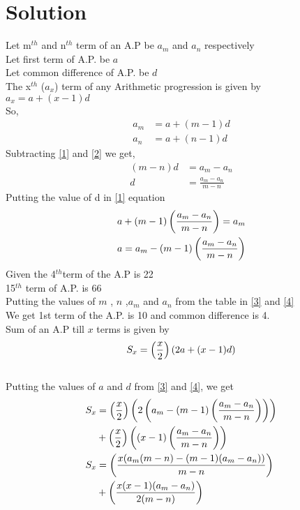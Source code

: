 \documentclass[journal,12pt,twocolumn]{IEEEtran}
\begin{document}
\section{Solution}
\begin{table}[h!]
   \label{table}
    \centering
   
\end{table}
Let m$^{th}$  and n$^{th}$ term of an A.P be $a_m$ and $a_n$ respectively\\
Let first term of A.P. be $a$\\
Let common difference of A.P. be $d$\\
The x$^{th}$ ($a_x$) term  of any Arithmetic progression is given by 
\\$a_x = a +(x-1)d$\\
So,
\begin{align}
a_m &= a+(m-1)d \label{1}\\
a_{n} &= a+(n-1)d \label{2}
\end{align}
Subtracting \eqref{1} and \eqref{2} we get,\\
\begin{align}
(m-n)d &= a_m - a_n\\
d &= \frac{a_m - a_n}{m-n}\label{3}
\end{align}
Putting the value of d in \eqref{1} equation 
\begin{align}
a + (m-1)\left(\frac{a_m - a_n}{m-n}\right) = a_m\\
a = a_m - (m-1)\left(\frac{a_m - a_n}{m-n}\right)\label{4}
\end{align}
Given the 4$^{th}$term of the A.P is 22\\
15$^{th}$ term of A.P. is 66\\
Putting the values of 
$m$ , $n$ ,$a_m$ and $a_n$ from the table 
in \eqref{3} and \eqref{4}\\
We get 1st term of the A.P. is 10 and common difference is 4.\\
Sum of an A.P till $x$ terms is given by\\
\begin{align}
S_x = \left(\frac{x}{2}\right)(2a+(x-1)d)
\end{align} \\
Putting the values of $a$ and $d$ from \eqref{3} and \eqref{4}, we get\\
\begin{align}
S_x &= \left(\frac{x}{2}\right)\left(2\left(a_m - (m-1)\left(\frac{a_m - a_n}{m-n}\right)\right)\right)\\\nonumber
&+\left(\frac{x}{2}\right)\left((x-1)\left(\frac{a_m - a_n}{m-n}\right)\right)\\
S_x &= \left(\frac{x(a_m(m-n)-(m-1)(a_m-a_n))}{m-n}\right)\label{5}\\\nonumber
&+ \left(\frac{x(x-1)(a_m-a_n)}{2(m-n)}\right)
\end{align}
\end{document}
